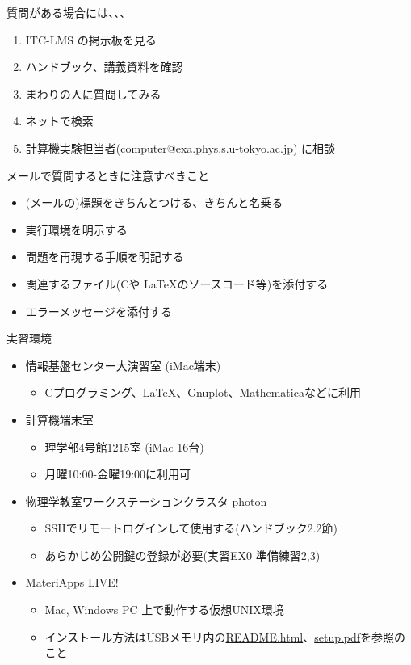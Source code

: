\documentclass[dvipdfmx]{beamer}
\begin{document}
\begin{frame}[t]{質問がある場合には、、、}
  \begin{enumerate}
  \item ITC-LMS の掲示板を見る
  \item ハンドブック、講義資料を確認
  \item まわりの人に質問してみる
  \item ネットで検索
  \item 計算機実験担当者(\href{mailto:computer@exa.phys.s.u-tokyo.ac.jp}{computer@exa.phys.s.u-tokyo.ac.jp}) に相談
  \end{enumerate}
  メールで質問するときに注意すべきこと
  \begin{itemize}
  \item (メールの)標題をきちんとつける、きちんと名乗る
  \item 実行環境を明示する
  \item 問題を再現する手順を明記する
  \item 関連するファイル(Cや \LaTeX のソースコード等)を添付する
  \item エラーメッセージを添付する
  \end{itemize}
\end{frame}

\begin{frame}[t,fragile]{実習環境}
  \begin{itemize}
    \setlength{\itemsep}{1em}
  \item 情報基盤センター大演習室 (iMac端末)
    \begin{itemize}
    \item Cプログラミング、\LaTeX、Gnuplot、Mathematicaなどに利用
    \end{itemize}
  \item 計算機端末室
    \begin{itemize}
    \item 理学部4号館1215室 (iMac 16台)
    \item 月曜10:00-金曜19:00に利用可
    \end{itemize}
  \item 物理学教室ワークステーションクラスタ photon
    \begin{itemize}
    \item SSHでリモートログインして使用する(ハンドブック2.2節)
    \item あらかじめ公開鍵の登録が必要(実習EX0 準備練習2,3)
    \end{itemize}
  \item MateriApps LIVE!
    \begin{itemize}
    \item Mac, Windows PC 上で動作する仮想UNIX環境
  \item インストール方法はUSBメモリ内の\href{https://github.com/cmsi/MateriAppsLive/wiki/MateriAppsLive-ltx}{README.html}、\href{https://github.com/cmsi/MateriAppsLive-setup/blob/master/ova/setup.pdf}{setup.pdf}を参照のこと
    \end{itemize}
  \end{itemize}
\end{frame}
\end{document}
